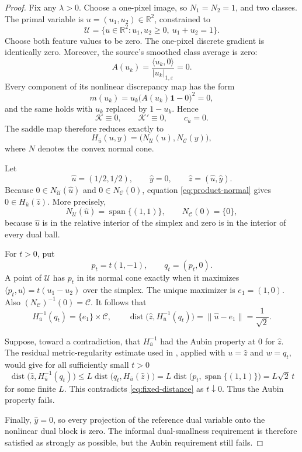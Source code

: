 \documentclass[11pt]{article}
\newcommand{\R}{\mathbb R}
\newcommand{\dist}{\operatorname{dist}}
\begin{document}
\begin{proof}
Fix any \(\lambda>0\). Choose a one-pixel image, so \(N_1=N_2=1\), and two classes. The primal
variable is \(u=(u_1,u_2)\in\R^2\), constrained to
\[
 \mathcal U=\{u\in\R^2:u_1,u_2\ge0,\ u_1+u_2=1\}.
\]
Choose both feature values to be zero. The one-pixel discrete gradient is
identically zero. Moreover, the source's smoothed class average is zero:
\[
 A(u_k)=\frac{\langle u_k,0\rangle}{|u_k|_{1,\varepsilon}}=0.
\]
Every component of its nonlinear discrepancy map has the form
\[
 m(u_k)=u_k\bigl(A(u_k)\mathbf 1-0\bigr)^2=0,
\]
and the same holds with \(u_k\) replaced by \(1-u_k\). Hence
\[
 \mathcal K\equiv0,\qquad \mathcal K'\equiv0,
 \qquad c_{\bar u}=0.
\]
The saddle map therefore reduces exactly to
\begin{equation}
 H_{\bar u}(u,y)=\bigl(N_{\mathcal U}(u),N_{\mathcal C}(y)\bigr),
 \label{eq:product-normal}
\end{equation}
where \(N\) denotes the convex normal cone.

Let
\[
 \widehat u=(1/2,1/2),\qquad \widehat y=0,
 \qquad \widehat z=(\widehat u,\widehat y).
\]
Because \(0\in N_{\mathcal U}(\widehat u)\) and
\(0\in N_{\mathcal C}(0)\), equation \eqref{eq:product-normal} gives
\(0\in H_{\bar u}(\widehat z)\). More precisely,
\[
 N_{\mathcal U}(\widehat u)=\operatorname{span}\{(1,1)\},
 \qquad N_{\mathcal C}(0)=\{0\},
\]
because \(\widehat u\) is in the relative interior of the simplex and zero is
in the interior of every dual ball.

For \(t>0\), put
\[
 p_t=t(1,-1),\qquad q_t=(p_t,0).
\]
A point of \(\mathcal U\) has \(p_t\) in its normal cone exactly when it
maximizes \(\langle p_t,u\rangle=t(u_1-u_2)\) over the simplex. The unique
maximizer is \(e_1=(1,0)\). Also
\((N_{\mathcal C})^{-1}(0)=\mathcal C\). It follows that
\begin{equation}
 H_{\bar u}^{-1}(q_t)=\{e_1\}\times\mathcal C,
 \qquad
 \dist\bigl(\widehat z,H_{\bar u}^{-1}(q_t)\bigr)
 =\|\widehat u-e_1\|=\frac1{\sqrt2}.
 \label{eq:fixed-distance}
\end{equation}

Suppose, toward a contradiction, that \(H_{\bar u}^{-1}\) had the Aubin
property at \(0\) for \(\widehat z\). The residual metric-regularity estimate
used in \cite{valkonen}, applied with \(u=\widehat z\) and \(w=q_t\), would
give for all sufficiently small \(t>0\)
\[
 \dist\bigl(\widehat z,H_{\bar u}^{-1}(q_t)\bigr)
 \le L\dist\bigl(q_t,H_{\bar u}(\widehat z)\bigr)
 =L\dist\bigl(p_t,\operatorname{span}\{(1,1)\}\bigr)
 =L\sqrt2\,t
\]
for some finite \(L\). This contradicts \eqref{eq:fixed-distance} as
\(t\downarrow0\). Thus the Aubin property fails.

Finally, \(\widehat y=0\), so every projection of the reference dual
variable onto the nonlinear dual block is zero. The informal dual-smallness
requirement is therefore satisfied as strongly as possible, but the Aubin
requirement still fails.
\end{proof}
\end{document}
